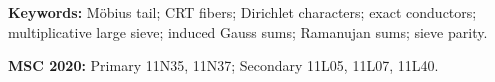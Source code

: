 \documentclass[11pt]{article}
\theoremstyle{definition}
\theoremstyle{remark}
\begin{document}
\noindent\textbf{Keywords:} M\"obius tail; CRT fibers; Dirichlet
characters; exact conductors; multiplicative large sieve; induced Gauss
sums; Ramanujan sums; sieve parity.

\medskip
\noindent\textbf{MSC 2020:} Primary 11N35, 11N37; Secondary
11L05, 11L07, 11L40.











\clearpage
\begingroup
\footnotesize


\endgroup
\end{document}
